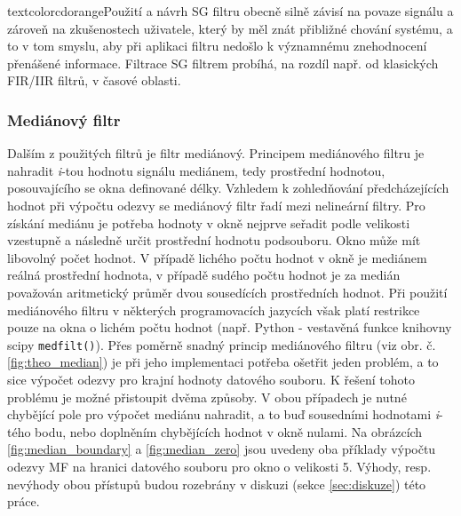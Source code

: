 \documentclass[a4paper, 12pt]{article}
\begin{document}
textcolor{cdorange}{Použití a návrh SG filtru obecně silně závisí na povaze signálu a zároveň na zkušenostech uživatele, který by měl znát přibližné chování systému, a to v tom smyslu, aby při aplikaci filtru nedošlo k významnému znehodnocení přenášené informace}.
\noindent Filtrace SG filtrem probíhá, na rozdíl např. od klasických FIR/IIR filtrů, v časové oblasti.

\subsubsection{Mediánový filtr}
\label{sec:filtr3}
Dalším z použitých filtrů je filtr mediánový. Principem mediánového filtru je nahradit \textit{i}-tou hodnotu signálu mediánem, tedy prostřední hodnotou, posouvajícího se okna definované délky. Vzhledem k zohledňování předcházejících hodnot při výpočtu odezvy se mediánový filtr řadí mezi nelineární filtry. Pro získání mediánu je potřeba hodnoty v okně nejprve seřadit podle velikosti vzestupně a následně určit prostřední hodnotu podsouboru. Okno může mít libovolný počet hodnot. V případě lichého počtu hodnot v okně je mediánem reálná prostřední hodnota, v případě sudého počtu hodnot je za medián považován aritmetický průměr dvou sousedících prostředních hodnot. Při použití mediánového filtru v některých programovacích jazycích však platí restrikce pouze na okna o lichém počtu hodnot (např. Python - vestavěná funkce knihovny scipy \texttt{medfilt()}). Přes poměrně snadný princip mediánového filtru (viz obr. č. \ref{fig:theo_median}) je při jeho implementaci potřeba ošetřit jeden problém, a to sice výpočet odezvy pro krajní hodnoty datového souboru. K řešení tohoto problému je možné přistoupit dvěma způsoby. V obou případech je nutné chybějící pole pro výpočet mediánu nahradit, a to buď sousedními hodnotami \textit{i}-tého bodu, nebo doplněním chybějících hodnot v okně nulami. Na obrázcích \ref{fig:median_boundary} a \ref{fig:median_zero} jsou uvedeny oba příklady výpočtu odezvy MF na hranici datového souboru pro okno o velikosti 5. Výhody, resp. nevýhody obou přístupů budou rozebrány v diskuzi (sekce \ref{sec:diskuze}) této práce.\vspace{6cm}
\end{document}
